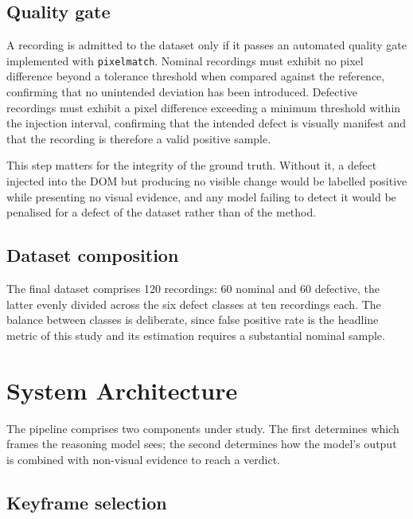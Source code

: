 \subsection{Quality gate}

A recording is admitted to the dataset only if it passes an automated
quality gate implemented with \texttt{pixelmatch}. Nominal recordings must
exhibit no pixel difference beyond a tolerance threshold when compared
against the reference, confirming that no unintended deviation has been
introduced. Defective recordings must exhibit a pixel difference exceeding
a minimum threshold within the injection interval, confirming that the
intended defect is visually manifest and that the recording is therefore a
valid positive sample.

This step matters for the integrity of the ground truth. Without it, a
defect injected into the DOM but producing no visible change would be
labelled positive while presenting no visual evidence, and any model
failing to detect it would be penalised for a defect of the dataset rather
than of the method.

\subsection{Dataset composition}

The final dataset comprises 120 recordings: 60 nominal and 60 defective,
the latter evenly divided across the six defect classes at ten recordings
each. The balance between classes is deliberate, since false positive rate
is the headline metric of this study and its estimation requires a
substantial nominal sample.


\section{System Architecture}
\label{sec:system_architecture}

The pipeline comprises two components under study. The first determines
which frames the reasoning model sees; the second determines how the
model's output is combined with non-visual evidence to reach a verdict.

\subsection{Keyframe selection}
\label{sec:keyframe}

